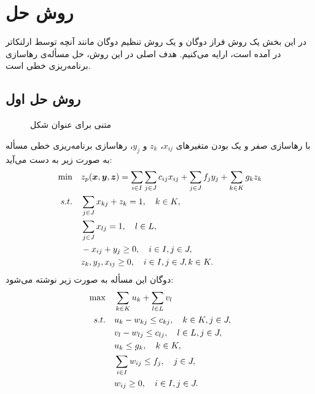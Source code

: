 \section{روش حل}
در این بخش یک روش فراز دوگان و یک روش تنظیم دوگان مانند آنچه توسط ارلنکاتر در \cite{E1978}  آمده است، ارایه می‌کنیم. هدف اصلی در این روش، حل مسأله‌ی رهاسازی برنامه‌ریزی خطی است. 
\subsection{روش حل اول}

\begin{figure}[t]

\caption{متنی برای عنوان شکل}
\end{figure}

با رهاسازی  صفر و یک بودن متغیرهای $x_{ij}$، $z_k$ و $y_j$، رهاسازی برنامه‌ریزی خطی مسأله به صورت زیر به دست می‌آید:
 \begin{align}
\min  \quad    & z_p({\boldsymbol x},{\boldsymbol y},{\boldsymbol z}) = \sum_{i\in I}\sum_{j\in J} c_{ij}x_{ij} +  \sum_{j\in J} f_j y_j  + \sum_{k\in K} g_kz_k \label{eqn:uflpss-lp-obj}\\
 s. t. \quad      & \sum_{j\in J} x_{kj} + z_k = 1,  \quad  k\in K,  \label{eqn:uflpss-lp-c1}\\
                & \sum_{j\in J} x_{lj} = 1,  \quad l\in L, \label{eqn:uflpss-lp-c2}\\
                &  -x_{ij} + y_j \geq 0,  \quad i\in I, j\in J,  \label{eqn:uflpss-lp-c3}\\
                & z_k,y_j, x_{ij} \geq 0, \quad i\in I, j\in J, k\in K. \label{eqn:uflpss-lp-c4}
 \end{align}
دوگان این مسأله به صورت زیر نوشته می‌شود:
 \begin{align}
 \max  \quad   &  \sum_{k\in K} u_k + \sum_{l\in L} v_l  \label{eqn:uflpss-weak-dual-obj}\\
 s. t. \quad     &   u_k - w_{kj} \leq c_{kj},        \quad  k\in K, j\in J,  \label{eqn:uflpss-weak-dual-c1}\\
               &   v_l - w_{lj} \leq c_{lj},          \quad l\in L,  j\in J,       \label{eqn:uflpss-weak-dual-c2}\\
               &   u_k \leq g_k,                      \quad  k\in K,       \label{eqn:uflpss-weak-dual-c3}\\
               &   \sum_{i\in I} w_{ij} \leq f_j,  \quad j\in J,       \label{eqn:uflpss-weak-dual-c4}\\
               & w_{ij} \geq 0, \quad i\in I, j\in J.                      \label{eqn:uflpss-weak-dual-c5}
 \end{align}

